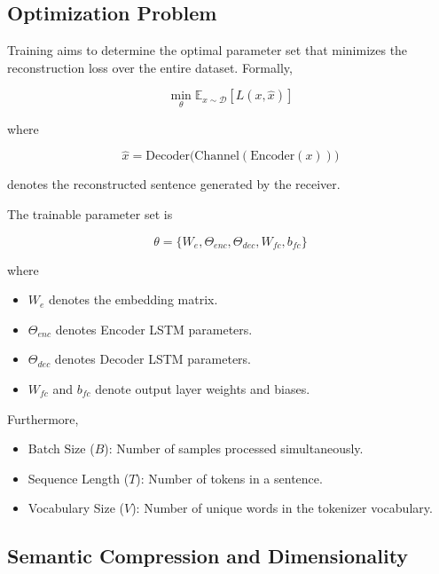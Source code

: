 \documentclass[twocolumn]{article}
\begin{document}
\subsection{Optimization Problem}

Training aims to determine the optimal parameter set that minimizes the reconstruction loss over the entire dataset. Formally,

\begin{equation}
\min_{\theta}
\mathbb{E}_{x\sim\mathcal{D}}
\left[
L(x,\hat{x})
\right]
\end{equation}

where

\begin{equation}
\hat{x}
=
\text{Decoder}
\Big(
\text{Channel}
(
\text{Encoder}(x)
)
\Big)
\end{equation}

denotes the reconstructed sentence generated by the receiver.

The trainable parameter set is

\begin{equation}
\theta
=
\{
W_e,
\Theta_{enc},
\Theta_{dec},
W_{fc},
b_{fc}
\}
\end{equation}

where

\begin{itemize}
    \item \(W_e\) denotes the embedding matrix.
    \item \(\Theta_{enc}\) denotes Encoder LSTM parameters.
    \item \(\Theta_{dec}\) denotes Decoder LSTM parameters.
    \item \(W_{fc}\) and \(b_{fc}\) denote output layer weights and biases.
\end{itemize}

Furthermore,

\begin{itemize}
    \item Batch Size (\(B\)): Number of samples processed simultaneously.
    \item Sequence Length (\(T\)): Number of tokens in a sentence.
    \item Vocabulary Size (\(V\)): Number of unique words in the tokenizer vocabulary.
\end{itemize}

\subsection{Semantic Compression and Dimensionality}
\end{document}
